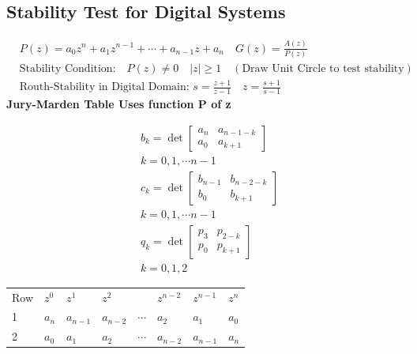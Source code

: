 \begin{multicols}{2}
\subsection{Stability Test for Digital Systems}
\vspace*{-0.45cm}
\begin{align*}
& P(z) = a_0z^n+a_1z^{n-1} + \cdots + a_{n-1}z+a_n \quad G(z)= \frac{A(z)}{P(z)} \\
& \text{Stability Condition:} \quad P(z) \neq 0 \quad |z| \geq 1 \quad (\text{Draw Unit Circle to test stability})\\
& \text{Routh-Stability in Digital Domain: } s = \frac{z+1}{z-1} \quad z=\frac{s+1}{s-1}
\end{align*}
\textbf{Jury-Marden Table Uses function P of z} \newline
\begin{minipage}[t]{1\linewidth}
\begin{minipage}[h]{0.25\linewidth}
\begin{align*}
& b_k = \det \begin{bmatrix}
a_n & a_{n-1-k} \\
a_0 & a_{k+1}
\end{bmatrix} \\
& k = 0,1,  \cdots n-1 \\
& c_k = \det \begin{bmatrix}
b_{n-1} & b_{n-2-k} \\
b_0 & b_{k+1}
\end{bmatrix} \\
& k = 0,1,  \cdots n-1 \\
& q_k = \det \begin{bmatrix}
p_{3} & p_{2-k} \\
p_0 & p_{k+1}
\end{bmatrix} \\
& k =0,1,2
\end{align*}
\end{minipage}
\begin{minipage}[h]{0.75\linewidth}
\begin{tabular}{llllllll}
Row & $z^0$     & $z^1$     & $z^2$     &          & $z^{n-2}$ & $z^{n-1}$ & $z^n$ \\ %
1   & $a_n$     & $a_{n-1}$ & $a_{n-2}$ & $\cdots$ & $a_2$     & $a_1$     & $a_0$ \\
2   & $a_0$     & $a_1$     & $a_2$     & $\cdots$ & $a_{n-2}$ & $a_{n-1}$ & $a_n$ \\

\end{tabular}
\end{minipage}
\end{minipage}
\end{multicols}
